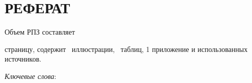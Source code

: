 \chapter*{РЕФЕРАТ}

Объем РПЗ составляет \begin{NoHyper}\pageref{LastPage}\end{NoHyper} страницу, содержит \totfig~иллюстрации, \tottab~таблиц, 1 приложение и  использованных источников.

\textit{Ключевые слова}: